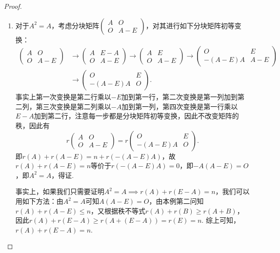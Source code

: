 \begin{proof}
\begin{enumerate}
        \item 对于$A^2=A$，考虑分块矩阵$\begin{pmatrix}
                      A & O \\ O & A-E
                  \end{pmatrix}$，对其进行如下分块矩阵初等变换：
              \begin{align*}
                  \begin{pmatrix}
                      A & O \\ O & A-E
                  \end{pmatrix} & \to\begin{pmatrix}
                                         A & E-A \\ O & A-E
                                     \end{pmatrix}
                  \to\begin{pmatrix}
                         A & E \\ O & A-E
                     \end{pmatrix}
                  \to\begin{pmatrix}
                         O & E \\ -(A-E)A & A-E
                     \end{pmatrix}                  \\
                                   & \to\begin{pmatrix}
                                            O & E \\ -(A-E)A & O
                                        \end{pmatrix}.
              \end{align*}
              事实上第一次变换是第二行乘以$-E$加到第一行，第二次变换是第一列加到第二列，第三次变换是第二列乘以$-A$加到第一列，第四次变换是第一行乘以$E-A$加到第二行，注意每一步都是分块矩阵初等变换，因此不改变矩阵的秩，因此有
              \[r\begin{pmatrix}
                      A & O \\ O & A-E
                  \end{pmatrix}=r\begin{pmatrix}
                      O & E \\ -(A-E)A & O
                  \end{pmatrix}.\]
              即$r(A)+r(A-E)=n+r(-(A-E)A)$，故$r(A)+r(A-E)=n$等价于$r(-(A-E)A)=0$，即$-A(A-E)=O$，即$A^2=A$，得证.

              事实上，如果我们只需要证明$A^2=A \implies r(A)+r(E-A)=n$，我们可以用如下方法：由$A^2=A$可知$A(A-E)=O$，由本例第二问知$r(A)+r(A-E)\leqslant n$，又根据秩不等式$r(A)+r(B)\geqslant r(A+B)$，因此$r(A)+r(E-A)\geqslant r(A+(E-A))=r(E)=n$. 综上可知，$r(A)+r(E-A)=n$.
    \end{enumerate}
\end{proof}

